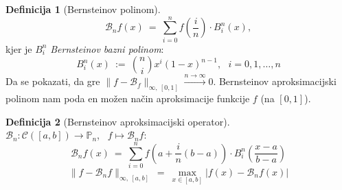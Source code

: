 \documentclass[11pt]{article}
\newcommand{\p}{\mathbb{P}}
\newcommand{\B}{\mathcal{B}}
\newcommand{\C}{\mathcal{C}}
\theoremstyle{definition}
\newtheorem{definicija}{Definicija}[section]
\theoremstyle{definition}
\begin{document}
\begin{definicija}[Bernsteinov polinom]

$$\B_n f(x) ~=~ \sum_{i=0}^n f(\frac{i}{n}) \cdot B_i^n(x),$$
kjer je $B_i^n$ \textit{Bernsteinov bazni polinom}:
$$B_i^n(x) ~:=~ \binom{n}{i} x^i (1-x)^{n-1}, ~~~i = 0, 1, \ldots, n$$
Da se pokazati, da gre $\|f - \B_f\|_{\infty,~[0, 1]} \xrightarrow{n \rightarrow \infty} 0$. Bernsteinov aproksimacijski polinom nam poda en možen način aproksimacije funkcije $f$ (na $[0,1]$).

\end{definicija}
\vspace{0.5cm}

\begin{definicija}[Bernsteinov aproksimacijski operator]
~\\
$\B_n: \C([a, b]) \rightarrow \p_n$, ~$f \mapsto \B_n f$:
$$\B_n f(x) ~=~ \sum_{i=0}^n f \left( a + \frac{i}{n} (b-a) \right) \cdot B_i^n(\frac{x-a}{b-a})$$
$$\|f - \B_n f\|_{\infty, ~[a, b]} ~=~ \max_{x \in [a, b]} |f(x) - \B_n f(x)|$$ 

\end{definicija}
\vspace{0.5cm}

\end{document}
